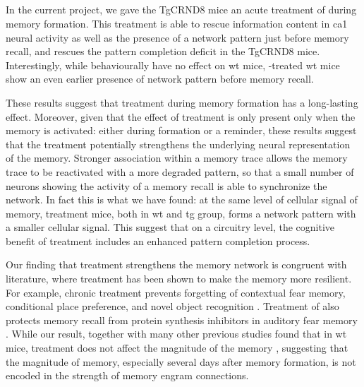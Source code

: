 \subsection{\tglu}

In the current project, we gave the TgCRND8 mice an acute treatment of \tglu during memory formation. This treatment is able to rescue information content in \gls{ca1} neural activity as well as the presence of a network pattern just before memory recall, and rescues the pattern completion deficit in the TgCRND8 mice. Interestingly, while behaviourally \tglu have no effect on \gls{wt} mice, \tglu-treated \gls{wt} mice show an even earlier presence of network pattern before memory recall. 

These results suggest that \tglu treatment during memory formation has a long-lasting effect. Moreover, given that the effect of \tglu treatment is only present only when the memory is activated: either during formation or a reminder, these results suggest that the \tglu treatment potentially strengthens the underlying neural representation of the memory. Stronger association within a memory trace allows the memory trace to be reactivated with a more degraded pattern, so that a small number of neurons showing the activity of a memory recall is able to synchronize the network. In fact this is what we have found: at the same level of cellular signal of memory, \tglu treatment mice, both in \gls{wt} and \gls{tg} group, forms a network pattern with a smaller cellular signal. This suggest that on a circuitry level, the cognitive benefit of \tglu treatment includes an enhanced pattern completion process.

Our finding that \tglu treatment strengthens the memory network is congruent with literature, where \tglu treatment has been shown to make the memory more resilient. For example, chronic \tglu treatment prevents forgetting of contextual fear memory, conditional place preference, and novel object recognition \citep{dong14, migues16}. Treatment of \tglu also protects memory recall from protein synthesis inhibitors in auditory fear memory \citep{lopez15}.
While our result, together with many other previous studies found that in \gls{wt} mice, \tglu treatment does not affect the magnitude of the memory \citep{dias12, dong14, migues16}, suggesting that the magnitude of memory, especially several days after memory formation, is not encoded in the strength of memory engram connections. 


